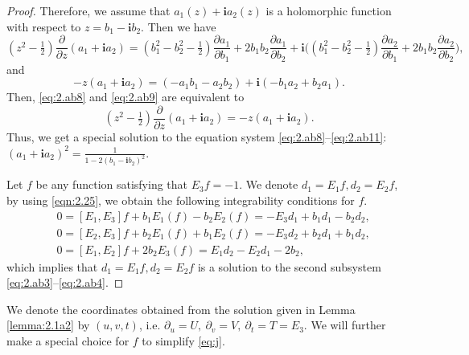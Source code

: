 \documentclass[reqno]{amsart}%
\theoremstyle{definition}
\numberwithin{equation}{section}
\begin{document}
\begin{proof}
Therefore, we assume that $a_1(z)+\mathbf{i}a_2(z)$ is a holomorphic function with respect
to $z=b_1-\mathbf{i}b_2$. Then we have
$$
(z^2-\tfrac{1}{2})\frac{\partial}{\partial z}(a_1+\mathbf{i}a_2)=
(b_1^2-b_2^2-\tfrac{1}{2})\frac{\partial a_1}{\partial b_1}+2b_1b_2\frac{\partial a_1}{\partial b_2}
+\mathbf{i}\Big((b_1^2-b_2^2-\tfrac{1}{2})\frac{\partial a_2}{\partial b_1}+2b_1b_2\frac{\partial a_2}{\partial b_2}\Big),
$$
and
$$
-z(a_1+\mathbf{i}a_2)=(-a_1b_1-a_2b_2)+\mathbf{i}(-b_1a_2+b_2a_1).
$$
Then, \eqref{eq:2.ab8} and \eqref{eq:2.ab9} are equivalent to
$$
(z^2-\tfrac{1}{2})\frac{\partial}{\partial z}(a_1+\mathbf{i}a_2)=-z(a_1+\mathbf{i}a_2).
$$
Thus, we get a special solution to the equation system \eqref{eq:2.ab8}--\eqref{eq:2.ab11}: $(a_1+\mathbf{i}a_2)^2=\frac{1}{1-2(b_1-\mathbf{i}b_2)^2}$.

Let $f$ be any function satisfying that $E_3f=-1$. We denote $d_1=E_1f, d_2=E_2f$, by using \eqref{eqn:2.25}, we obtain the following integrability conditions for $f$.
$$
\begin{aligned}
	&0=[E_1,E_3]f+b_1E_1(f)-b_2E_2(f)=-E_3d_1+b_1d_1-b_2d_2,\\
	&0=[E_2,E_3]f+b_2E_1(f)+b_1E_2(f)=-E_3d_2+b_2d_1+b_1d_2,\\
	&0=[E_1,E_2]f+2b_2E_3(f)=E_1d_2-E_2d_1-2b_2,
\end{aligned}
$$
which implies that  $d_1=E_1f, d_2=E_2f$ is a solution to the
second subsystem \eqref{eq:2.ab3}--\eqref{eq:2.ab4}.
\end{proof}

We denote the coordinates obtained from the solution given in Lemma \ref{lemma:2.1a2} by $(u,v,t)$, i.e.
$\partial_u=U,\ \partial_v=V,\ \partial_t=T=E_3$.
We will further make a special choice for $f$ to simplify \eqref{eq:j}.
\end{document}
